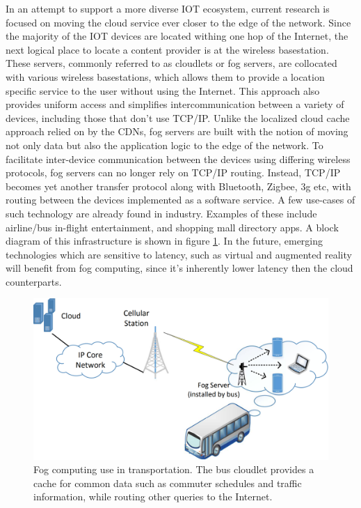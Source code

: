 In an attempt to support a more diverse IOT ecosystem, current research is focused on moving the cloud service ever closer to the edge of the network.
Since the majority of the IOT devices are located withing one hop of the Internet, the next logical place to locate a content provider is at the wireless basestation.\cite{satyanarayanan2017emergence} These servers, commonly referred to as cloudlets or fog servers, are collocated with various wireless basestations, which allows them to provide a location specific service to the user without using the Internet.
This approach also provides uniform access and simplifies intercommunication between a variety of devices, including those that don't use TCP/IP. Unlike the localized cloud cache approach relied on by the CDNs, fog servers are built with the notion of moving not only data but also the application logic to the edge of the network.
To facilitate inter-device communication between the devices using differing wireless protocols, fog servers can no longer rely on TCP/IP routing.
Instead, TCP/IP becomes yet another transfer protocol along with Bluetooth, Zigbee, 3g etc, with routing between the devices implemented as a software service.\cite{edgeiot} A few use-cases of such technology are already found in industry.
Examples of these include airline/bus in-flight entertainment, and shopping mall directory apps.
A block diagram of this infrastructure is shown in figure \ref{lit:fig:3}.
In the future, emerging technologies which are sensitive to latency, such as virtual and augmented reality will benefit from fog computing, since it's inherently lower latency then the cloud counterparts.

\begin{figure}[h]
    \centering
    \includegraphics[width=0.6\linewidth]{img/fog_comp.png}
    \caption{Fog computing use in transportation.
    The bus cloudlet provides a cache for common data such as commuter schedules and traffic information, while routing other queries to the Internet.\cite{edgeiot}}
    \label{lit:fig:3}
\end{figure}

